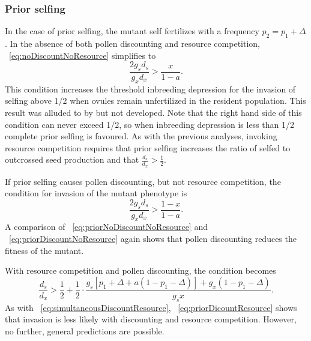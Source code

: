 \documentclass[letterpaper,titlepage]{scrartcl}
\begin{document}
\subsubsection{Prior selfing}
In the case of prior selfing, the mutant self fertilizes with a
frequency $p_{2}=p_{1}+\Delta$. In the absence of both pollen
discounting and resource competition,
{\eref}~\eqref{eq:noDiscountNoResource} simplifies to
\begin{equation}\label{eq:priorNoDiscountNoResource}
  \frac{2g_{s}d_{s}}{g_{x}d_{x}}>\frac{x}{1-a}.
\end{equation}
This condition increases the threshold inbreeding depression for the
invasion of selfing above 1/2 when ovules remain unfertilized in the
resident population. This result was alluded to by \citet{Lloyd79} but
not developed. Note that the right hand side of this condition can
never exceed 1/2, so when inbreeding depression is less than 1/2
complete prior selfing is favoured. As with the previous analyses,
invoking resource competition requires that prior selfing increases
the ratio of selfed to outcrossed seed production and that
$\frac{d_{s}}{d_{x}}>\frac{1}{2}$.

If prior selfing causes pollen discounting, but not resource
competition, the condition for invasion of the mutant phenotype is
\begin{equation}\label{eq:priorDiscountNoResource}
  \frac{2g_{s}d_{s}}{g_{x}d_{x}}>\frac{1-x}{1-a}.
\end{equation}
A comparison of {\eref}~\eqref{eq:priorNoDiscountNoResource} and
{\eref}~\eqref{eq:priorDiscountNoResource} again shows that pollen
discounting reduces the fitness of the mutant.

With resource competition and pollen discounting, the condition
becomes
\begin{equation}\label{eq:priorDicountResource}
  \frac{d_{s}}{d_{x}}>\frac{1}{2}+\frac{1}{2}\cdot\frac{g_{s}[p_{1}+\Delta+a(1-p_{1}-\Delta)]+g_{x}(1-p_{1}-\Delta)}{g_{s}x}.
\end{equation}
As with {\eref}~\eqref{eq:simultaneousDiscountResource},
{\eref}~\eqref{eq:priorDicountResource} shows that invasion is less
likely with discounting and resource competition. However, no further,
general predictions are possible.
\end{document}
